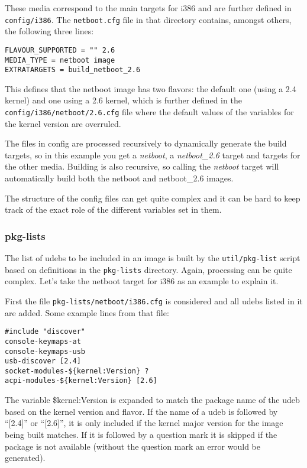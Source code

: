 \documentclass[a4paper,10pt]{article}
\begin{document}
These media correspond to the main targets for i386 and are further defined in \texttt{config/i386}. The \texttt{netboot.cfg} file in that directory contains, amongst others, the following three lines: 

\begin{verbatim}
FLAVOUR_SUPPORTED = "" 2.6
MEDIA_TYPE = netboot image
EXTRATARGETS = build_netboot_2.6
\end{verbatim}

This defines that the netboot image has two flavors: the default one (using a 2.4 kernel) and one using a 2.6 kernel, which is further defined in the \texttt{config/i386/netboot/2.6.cfg} file where the default values of the variables for the kernel version are overruled. 

The files in config are processed recursively to dynamically generate the build targets, so in this example you get a \textit{netboot}, a \textit{netboot\_2.6} target and targets for the other media. Building is also recursive, so calling the \textit{netboot} target will automatically build both the netboot and netboot\_2.6 images. 

The structure of the config files can get quite complex and it can be hard to keep track of the exact role of the different variables set in them. 

\subsubsection*{pkg-lists}
The list of udebs to be included in an image is built by the \texttt{util/pkg-list} script based on definitions in the \texttt{pkg-lists} directory. Again, processing can be quite complex. Let's take the netboot target for i386 as an example to explain it. 

First the file \texttt{pkg-lists/netboot/i386.cfg} is considered and all udebs listed in it are added. Some example lines from that file:

\begin{verbatim}
#include "discover"
console-keymaps-at
console-keymaps-usb
usb-discover [2.4]
socket-modules-${kernel:Version} ?
acpi-modules-${kernel:Version} [2.6]
\end{verbatim}

The variable \${kernel:Version} is expanded to match the package name of the udeb based on the kernel version and flavor. If the name of a udeb is followed by “[2.4]” or “[2.6]”, it is only included if the kernel major version for the image being built matches. If it is followed by a question mark it is skipped if the package is not available (without the question mark an error would be generated). 
\end{document}
